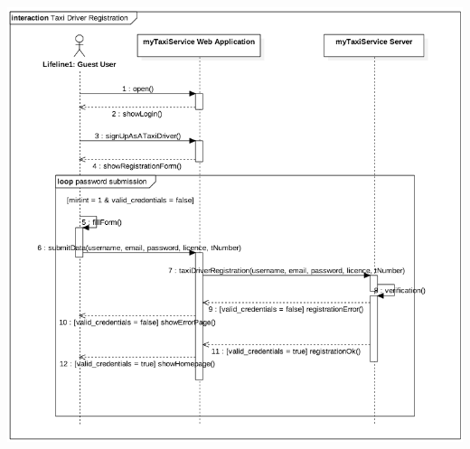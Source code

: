 				\begin{centering}
					\includegraphics[scale=0.5]{IMG/InteractionDiagrams/TaxiDriverRegistration.png}
				\end{centering}